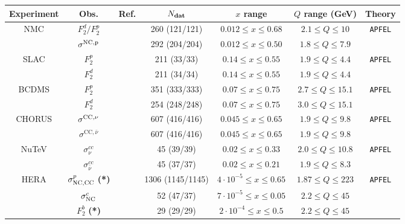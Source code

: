 
\begin{table}
\footnotesize
\begin{centering}
      \renewcommand{\arraystretch}{1.4}
  \begin{tabular}{|c|c|c|c|c|c|c|}
\hline
{Experiment} & Obs. & {Ref.}  & $ N_{\rm \bf dat}$ & $x$ range  & $Q$ range (GeV)  & Theory \tabularnewline
\hline
\hline
\multirow{2}{*}{NMC}
&   $F_2^d/F_2^p$ & \cite{Arneodo:1996kd}&   260 (121/121) & $ 0.012\le x \le 0.68$
& $ 2.1 \le Q \le 10 $  &\multirow{2}{*}{\tt APFEL}\tabularnewline
&   $\sigma^{\rm NC,p}$ & \cite{Arneodo:1996qe} & 292 (204/204) &
$0.012 \le x \le 0.50$ & $ 1.8 \le Q \le 7.9 $  &  \tabularnewline
\hline
\multirow{2}{*}{SLAC} &   $F_2^p$ & \cite{Whitlow:1991uw} &  211 (33/33)
& $ 0.14\le x \le 0.55$  &
$ 1.9 \le Q \le 4.4 $  & \multirow{2}{*}{\tt APFEL}\tabularnewline
&   $F_2^d$ & \cite{Whitlow:1991uw}& 211 (34/34) &
$ 0.14 \le x \le 0.55 $ & $ 1.9\le Q \le 4.4 $  & \tabularnewline
\hline
\multirow{2}{*}{BCDMS} &   $F_2^p$ & \cite{bcdms1}&  351 (333/333) & $0.07 \le x \le 0.75$ & $
2.7\le Q \le 15.1 $  &
\multirow{2}{*}{\tt APFEL}\tabularnewline
&   $F_2^d$ & \cite{bcdms2}&  254 (248/248) & $0.07 \le x \le 0.75$ & $ 3.0\le  Q \le
15.1$  & \tabularnewline
\hline
\multirow{2}{*}{CHORUS} &  $\sigma^{\rm CC,\nu}$  & \cite{Onengut:2005kv} & 607 (416/416) &
$0.045 \le x \le 0.65 $  &
$ 1.9\le Q \le 9.8 $  &
\multirow{2}{*}{\tt APFEL} \tabularnewline
&   $\sigma^{\mathrm{CC},\bar{\nu}}$ & \cite{Onengut:2005kv} & 607 (416/416)  & $0.045 \le x \le 0.65$  &
$ 1.9 \le Q \le 9.8 $  & \tabularnewline
\hline
\multirow{2}{*}{NuTeV} &    $\sigma_\nu^{cc}$ & \cite{Goncharov:2001qe,MasonPhD} & 45 (39/39)
&$ 0.02 \le x \le 0.33 $ &
$ 2.0 \le Q \le 10.8  $ 
& \multirow{2}{*}{\tt APFEL} \tabularnewline
&   $\sigma_{\bar{\nu}}^{cc}$ & \cite{Goncharov:2001qe,MasonPhD} & 45 (37/37) &
$ 0.02 \le x \le 0.21$&
$ 1.9 \le Q \le 8.3 $ 
&\tabularnewline
\hline
\multirow{3}{*}{HERA}  &  $\sigma_{\rm NC,CC}^{p}$ {\bf (*)} & \cite{Abramowicz:2015mha}
&  1306 (1145/1145)  & $4\cdot 10^{-5}\le x \le 0.65$ & $ 1.87 \le Q \le 223 $   & \multirow{3}{*}{\tt APFEL}
 \tabularnewline
  & $\sigma_{\rm NC}^{c}$    & \cite{Abramowicz:1900rp} & 52 (47/37) & $7 \cdot 10^{-5} \le x \le 0.05$  & $2.2 \le Q \le 45$  &
 \tabularnewline
 &  $F_2^b$   {\bf (*)} & \cite{Aaron:2009af,Abramowicz:2014zub} & 29 (29/29) & $ 2\cdot 10^{-4}\le x \le
 0.5 $ & $ 2.2 \le Q \le 45$  &

\end{tabular}
\end{centering}
\end{table}
